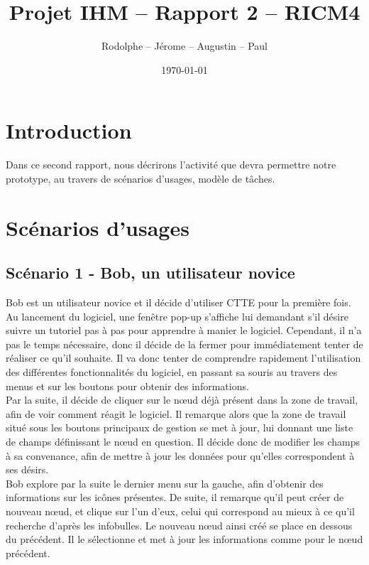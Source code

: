 \documentclass[12pt, a4paper]{article}
\title{Projet IHM -- Rapport 2 -- RICM4}
\author{\bsc{Fréby} Rodolphe -- \bsc{Barbier} Jérome -- \bsc{Husson} Augustin -- \bsc{Labat} Paul}
\date{\today}
\begin{document}
\maketitle
\tableofcontents
\newpage

\section{Introduction}
Dans ce second rapport, nous décrirons l'activité que devra permettre notre prototype, au travers de scénarios d'usages, modèle de tâches.

\section{Scénarios d'usages}
\subsection{Scénario 1 - Bob, un utilisateur novice}


Bob est un utilisateur novice et il décide d'utiliser CTTE pour la première fois. Au lancement du logiciel, une fenêtre pop-up s'affiche lui demandant s’il désire suivre un tutoriel pas à pas pour apprendre à manier le logiciel. Cependant, il n'a pas le temps nécessaire, donc il décide de la fermer pour immédiatement tenter de réaliser ce qu'il souhaite. Il va donc tenter de comprendre rapidement l'utilisation des différentes fonctionnalités du logiciel, en passant sa souris au travers des menus et sur les boutons pour obtenir des informations.\\ 


Par la suite, il décide de cliquer sur le nœud déjà présent dans la zone de travail, afin de voir comment réagit le logiciel. Il remarque alors que la zone de travail situé sous les boutons principaux de gestion se met à jour, lui donnant une liste de champs définissant le nœud en question. Il décide donc de modifier les champs à sa convenance, afin de mettre à jour les données pour qu'elles correspondent à ses désirs.\\


Bob explore par la suite le dernier menu sur la gauche, afin d'obtenir des informations sur les icônes présentes. De suite, il remarque qu'il peut créer de nouveau nœud, et clique sur l'un d'eux, celui qui correspond au mieux à ce qu'il recherche d'après les infobulles. Le nouveau nœud ainsi créé se place en dessous du précédent. Il le sélectionne et met à jour les informations comme pour le nœud précédent. \\
\end{document}

